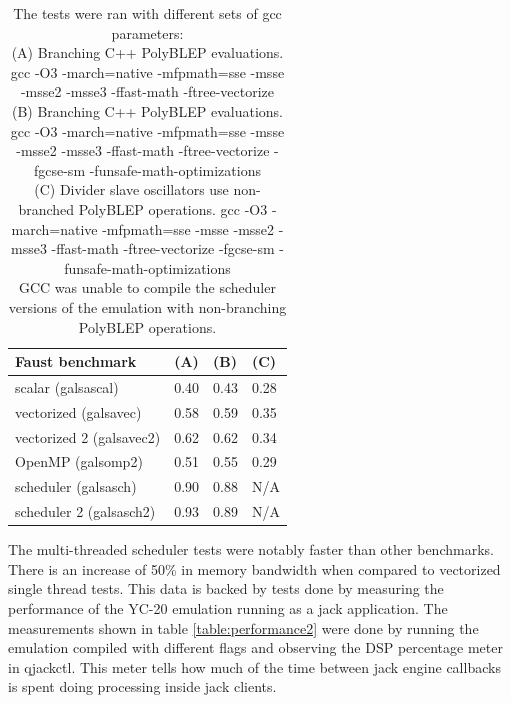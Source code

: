 \documentclass[11pt,a4paper]{article}
\begin{document}
\begin{table}[h]
 \begin{center}
\begin{tabular}{|l|l|l|l|}

      \hline
      Faust benchmark          & (A)  & (B)  & (C) \\
      \hline\hline
      scalar (galsascal)       & 0.40 & 0.43 & 0.28 \\
      vectorized (galsavec)    & 0.58 & 0.59 & 0.35 \\
      vectorized 2 (galsavec2) & 0.62 & 0.62 & 0.34 \\
      OpenMP (galsomp2)        & 0.51 & 0.55 & 0.29 \\
      scheduler (galsasch)     & 0.90 & 0.88 & N/A \\
      scheduler 2 (galsasch2)  & 0.93 & 0.89 & N/A \\
      \hline

\end{tabular}
\caption{The tests were ran with different sets of gcc parameters: \\
(A) Branching C++ PolyBLEP evaluations. gcc -O3 -march=native -mfpmath=sse -msse -msse2 -msse3 -ffast-math -ftree-vectorize \\
(B) Branching C++ PolyBLEP evaluations. gcc -O3 -march=native -mfpmath=sse -msse -msse2 -msse3 -ffast-math -ftree-vectorize -fgcse-sm  -funsafe-math-optimizations \\
(C) Divider slave oscillators use non-branched PolyBLEP operations. gcc -O3 -march=native -mfpmath=sse -msse -msse2 -msse3 -ffast-math -ftree-vectorize -fgcse-sm  -funsafe-math-optimizations \\
GCC was unable to compile the scheduler versions of the emulation with non-branching PolyBLEP operations.\\
}\label{table:performance}
 \end{center}
\end{table}

The multi-threaded scheduler tests were notably faster than other benchmarks. There is an increase of 50\% in memory bandwidth when compared to vectorized single thread tests. This data is backed by tests done by measuring the performance of the YC-20 emulation running as a jack application. The measurements shown in table \ref{table:performance2} were done by running the emulation compiled with different flags and observing the DSP percentage meter in qjackctl. This meter tells how much of the time between jack engine callbacks is spent doing processing inside jack clients.
\end{document}
